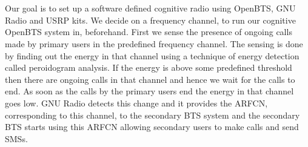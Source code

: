 \chapter*{}
Our goal is to set up a software defined cognitive radio using OpenBTS, GNU Radio and USRP kits. 
We decide on a frequency channel, to run our cognitive OpenBTS system in, beforehand. 
First we sense the presence of ongoing calls made by primary users in the predefined frequency channel. 
The sensing is done by finding out the energy in that channel using a technique of energy detection called peroidogram analysis.
If the energy is above some predefined threshold then there are ongoing calls in that channel and hence 
we wait for the calls to end. 
As soon as the calls by the primary users end the energy in that channel goes low.
GNU Radio detects this change and it provides the ARFCN, corresponding to this channel, 
to the secondary BTS system and the secondary BTS starts using this ARFCN allowing 
secondary users to make calls and send SMSs.
